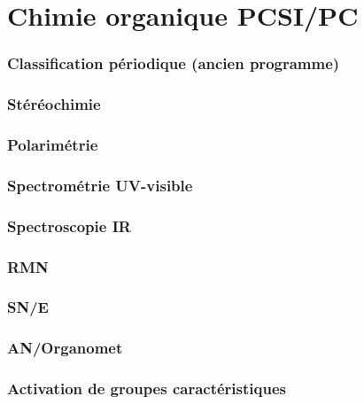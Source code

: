 \setcounter{part}{32}  %

\part{Chimie organique PCSI/PC}
\section{Classification périodique (ancien programme)}






\section{Stéréochimie}


\section{Polarimétrie}


\section{Spectrométrie UV-visible}



\section{Spectroscopie IR}




\section{RMN}






\section{SN/E}






\section{AN/Organomet}





\section{Activation de groupes caractéristiques}




